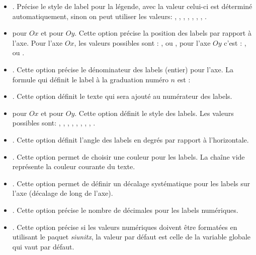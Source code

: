 \begin{itemize}
\begin{itemize}
            \item {}. Précise le style de label pour la légende, avec la valeur  celui-ci est déterminé automatiquement, sinon on peut utiliser les valeurs: , , , , , , , .
            
            \item {} pour $Ox$ et  pour $Oy$. Cette option précise la position des labels par rapport à l'axe. Pour l'axe $Ox$, les valeurs possibles sont : ,  ou , pour l'axe $Oy$ c'est :  ,  ou .
            
            \item {}. Cette option précise le dénominateur des labels (entier) pour l'axe. La formule qui définit le label à la graduation numéro $n$ est : 
            
            \item {}. Cette option définit le texte qui sera ajouté au numérateur des labels.
            
            \item {} pour $Ox$ et  pour $Oy$. Cette option définit le style des labels. Les valeurs possibles sont: , , , , , , , , .
            
            \item {}. Cette option définit l'angle des labels en degrés par rapport à l'horizontale.
            
            \item {}. Cette option permet de choisir une couleur pour les labels. La chaîne vide représente la couleur courante du texte.
            
            \item {}. Cette option permet de définir un décalage systématique pour les labels sur l'axe (décalage de long de l'axe).
            
            \item {}. Cette option précise le nombre de décimales pour les labels numériques.
            
            \item {}. Cette option précise si les valeurs numériques doivent être formatées en utilisant le paquet \emph{siunitx}, la valeur par défaut est celle de la variable globale  qui vaut \false par défaut.
            

\end{itemize}
\end{itemize}
